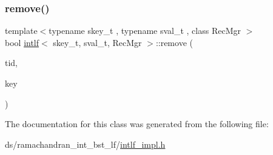 \mbox{\label{classintlf_a4f90087f9da607ffbcfad794131ddf17}} 
\subsubsection{\texorpdfstring{remove()}{remove()}}
{\footnotesize\ttfamily template$<$typename skey\+\_\+t , typename sval\+\_\+t , class Rec\+Mgr $>$ \\
bool \hyperlink{classintlf}{intlf}$<$ skey\+\_\+t, sval\+\_\+t, Rec\+Mgr $>$\+::remove (\begin{DoxyParamCaption}\item[{const int}]{tid,  }\item[{skey\+\_\+t}]{key }\end{DoxyParamCaption})\hspace{0.3cm}{\ttfamily [inline]}}



The documentation for this class was generated from the following file\+:\begin{DoxyCompactItemize}
\item 
ds/ramachandran\+\_\+int\+\_\+bst\+\_\+lf/\hyperlink{intlf__impl_8h}{intlf\+\_\+impl.\+h}\end{DoxyCompactItemize}
